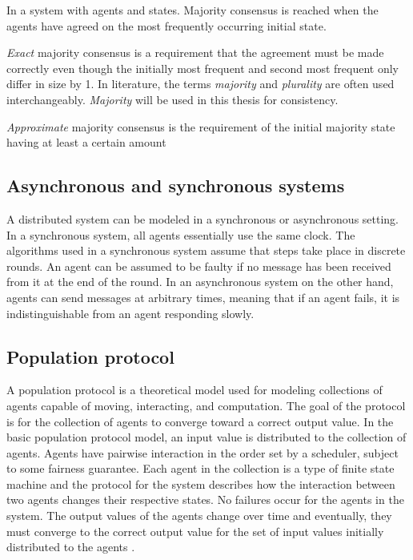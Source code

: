 \begin{definition}
In a system with  agents and  states. Majority consensus is reached when the agents have agreed on the most frequently occurring initial state. 
\end{definition}
 
 \emph{Exact} majority consensus is a requirement that the agreement must be made correctly even though the initially most frequent and second most frequent only differ in size by 1. In literature, the terms \emph{majority} and \emph{plurality} are often used interchangeably. \emph{Majority} will be used in this thesis for consistency.

\emph{Approximate} majority consensus is the requirement of the initial majority state having at least a certain amount 


\subsection{Asynchronous and synchronous systems}

A distributed system can be modeled in a synchronous or asynchronous setting. In a synchronous system, all agents essentially use the same clock. The algorithms used in a synchronous system assume that steps take place in discrete rounds. An agent can be assumed to be faulty if no message has been received from it at the end of the round. In an asynchronous system on the other hand, agents can send messages at arbitrary times, meaning that if an agent fails, it is indistinguishable from an agent responding slowly.


\subsection{Population protocol}
 A population protocol is a theoretical model used for modeling collections of agents capable of moving, interacting, and computation. The goal of the protocol is for the collection of agents to converge toward a correct output value. In the basic population protocol model, an input value is distributed to the collection of agents. Agents have pairwise interaction in the order set by a scheduler, subject to some fairness guarantee. Each agent in the collection is a type of finite state machine and the protocol for the system describes how the interaction between two agents changes their respective states. No failures occur for the agents in the system. The output values of the agents change over time and eventually, they must converge to the correct output value for the set of input values initially distributed to the agents \cite{aspnesIntroductionPopulationProtocols2009}. 

